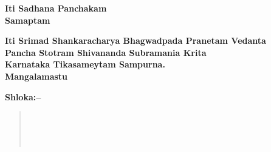 \begin{center}
\textbf{Iti Sadhana Panchakam\\ Samaptam}
\end{center}

\begin{center}
\textbf{Iti Srimad Shankaracharya Bhagwadpada Pranetam Vedanta\\ Pancha Stotram Shivananda Subramania Krita\\ Karnataka Tikasameytam Sampurna.\\ Mangalamastu}
\end{center}

\textbf{Shloka:–}

\begin{verse}
 \\\\\\
\end{verse}

